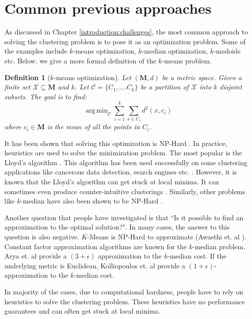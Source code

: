 \documentclass[letterpaper,12pt,titlepage,oneside,final]{book}
\DeclareMathOperator*{\argmin}{arg\,min}
\newtheorem{definition}{Definition}
\newcommand{\mc}{\mathcal}
\newcommand{\mb}{\mathbf}
\begin{document}
\section{Common previous approaches}
As discussed in Chapter \ref{introduction:challenges}, the most common approach to solving the clustering problem is to pose it as an optimization problem. Some of the examples include $k$-means optimization, $k$-median optimization, $k$-medoids etc. Below, we give a more formal definition of the $k$-means problem. 

\begin{definition}[$k$-means optimization]
Let $(\mb M, d)$ be a metric space. Given a finite set $\mc X \subseteq \mb M$ and $k$. Let $\mc C = \{C_1, \ldots. C_k\}$ be a partition of $\mc X$ into $k$ disjoint subsets. The goal is to find:
$$\argmin_{\mc C} \sum_{i=1}^k \sum_{x \in C_i} d^2(x, c_i)$$
where $c_i \in \mb M$ is the mean of all the points in $C_i$.  
\end{definition}

It has been shown that solving this optimization is NP-Hard \cite{dasgupta2008hardness}. In practice, heuristics are used to solve the minimization problem. The most popular is the Lloyd's algorithm \cite{lloyd1982least}. This algorithm has been used successfully on some clustering applications like cancerous data detection, search engines etc. \cite{wang2005comparison,liu2007clustering}. However, it is known that the Lloyd's algorithm can get stuck at local minima. It can sometimes even produce counter-intuitive clusterings \cite{mirkes2011k}. Similarly, other problems like $k$-median have also been shown to be NP-Hard \cite{megiddo1984complexity}.  

Another question that people have investigated is that ``Is it possible to find an approximation to the optimal solution?". In many cases, the answer to this question is also negative. $K$-Means is NP-Hard to approximate (Awasthi et. al \cite{awasthi2015hardness}). Constant factor approximation algorithms are known for the $k$-median problem. Arya et. al \cite{arya2004local} provide a $(3+\epsilon)$ approximation to the $k$-median cost. If the underlying metric is Euclidean, Kolliopoulos et. al \cite{kolliopoulos1999nearly} provide a $(1+\epsilon)$-approximation to the $k$-median cost. 

In majority of the cases, due to computational hardness, people have to rely on heuristics to solve the clustering problem. These heuristics have no performance guarantees and can often get stuck at local minima. 
\end{document}
